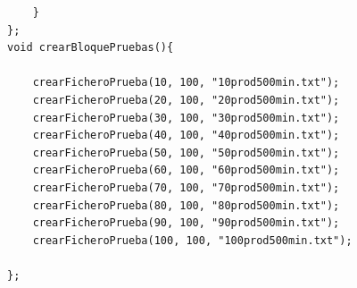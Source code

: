 \documentclass[es]{ifirak}
\begin{document}
\begin{lstlisting}
	}
};
void crearBloquePruebas(){

	crearFicheroPrueba(10, 100, "10prod500min.txt");
	crearFicheroPrueba(20, 100, "20prod500min.txt");
	crearFicheroPrueba(30, 100, "30prod500min.txt");
	crearFicheroPrueba(40, 100, "40prod500min.txt");
	crearFicheroPrueba(50, 100, "50prod500min.txt");
	crearFicheroPrueba(60, 100, "60prod500min.txt");
	crearFicheroPrueba(70, 100, "70prod500min.txt");
	crearFicheroPrueba(80, 100, "80prod500min.txt");
	crearFicheroPrueba(90, 100, "90prod500min.txt");
	crearFicheroPrueba(100, 100, "100prod500min.txt");

};

\end{lstlisting}
\end{document}
